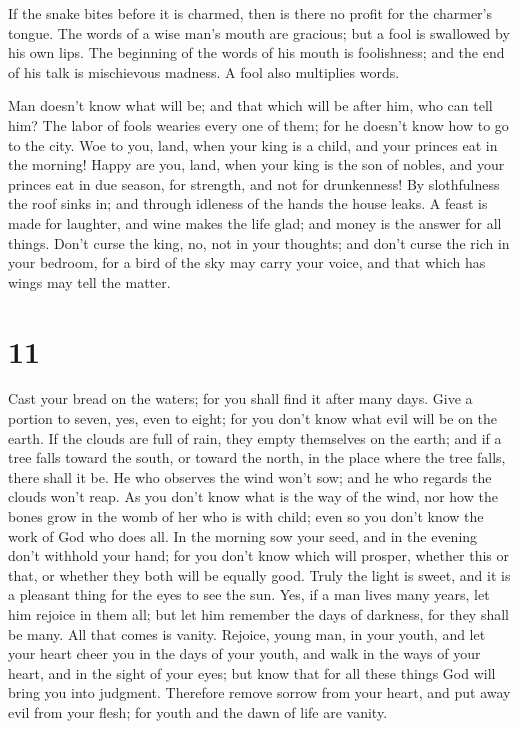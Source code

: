  If the snake bites before it is charmed, then is there
no profit for the charmer's tongue.  The words of a wise
man's mouth are gracious; but a fool is swallowed by his own lips.
 The beginning of the words of his mouth is foolishness;
and the end of his talk is mischievous madness.  A fool
also multiplies words.

Man doesn't know what will be; and that which will be after him, who can
tell him?  The labor of fools wearies every one of them;
for he doesn't know how to go to the city.  Woe to you,
land, when your king is a child, and your princes eat in the morning!
 Happy are you, land, when your king is the son of
nobles, and your princes eat in due season, for strength, and not for
drunkenness!  By slothfulness the roof sinks in; and
through idleness of the hands the house leaks.  A feast
is made for laughter, and wine makes the life glad; and money is the
answer for all things.  Don't curse the king, no, not in
your thoughts; and don't curse the rich in your bedroom, for a bird of
the sky may carry your voice, and that which has wings may tell the
matter.

\hypertarget{section-10}{%
\section{11}\label{section-10}}

 Cast your bread on the waters; for you shall find it
after many days.  Give a portion to seven, yes, even to
eight; for you don't know what evil will be on the earth. 
If the clouds are full of rain, they empty themselves on the earth; and
if a tree falls toward the south, or toward the north, in the place
where the tree falls, there shall it be.  He who observes
the wind won't sow; and he who regards the clouds won't reap.
 As you don't know what is the way of the wind, nor how
the bones grow in the womb of her who is with child; even so you don't
know the work of God who does all.  In the morning sow
your seed, and in the evening don't withhold your hand; for you don't
know which will prosper, whether this or that, or whether they both will
be equally good.  Truly the light is sweet, and it is a
pleasant thing for the eyes to see the sun.  Yes, if a man
lives many years, let him rejoice in them all; but let him remember the
days of darkness, for they shall be many. All that comes is vanity.
 Rejoice, young man, in your youth, and let your heart
cheer you in the days of your youth, and walk in the ways of your heart,
and in the sight of your eyes; but know that for all these things God
will bring you into judgment.  Therefore remove sorrow
from your heart, and put away evil from your flesh; for youth and the
dawn of life are vanity.

